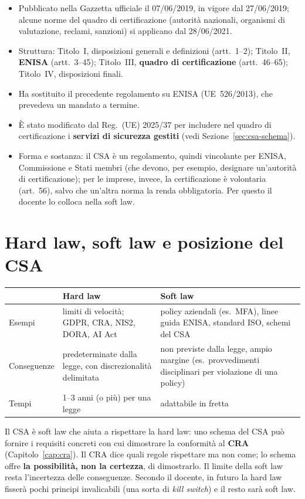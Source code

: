 \begin{integrazione}
\begin{itemize}
  \item Pubblicato nella Gazzetta ufficiale il 07/06/2019, in vigore dal 27/06/2019; alcune norme del
    quadro di certificazione (autorità nazionali, organismi di valutazione, reclami, sanzioni) si applicano
    dal 28/06/2021.
  \item Struttura: Titolo~I, disposizioni generali e definizioni (artt.~1--2); Titolo~II,
    \textbf{ENISA} (artt.~3--45); Titolo~III, \textbf{quadro di certificazione} (artt.~46--65);
    Titolo~IV, disposizioni finali.
  \item Ha sostituito il precedente regolamento su ENISA (UE~526/2013), che prevedeva un mandato a
    termine.
  \item È stato modificato dal Reg.~(UE) 2025/37 per includere nel quadro di certificazione i
    \textbf{servizi di sicurezza gestiti} (vedi Sezione~\ref{sec:csa-schema}).
  \item Forma e sostanza: il CSA è un regolamento, quindi vincolante per ENISA, Commissione e Stati
    membri (che devono, per esempio, designare un'autorità di certificazione); per le imprese, invece,
    la certificazione è volontaria (art.~56), salvo che un'altra norma la renda obbligatoria. Per questo
    il docente lo colloca nella soft law.
\end{itemize}
\end{integrazione}

\section{Hard law, soft law e posizione del CSA}
\label{sec:csa-softlaw}

\begin{center}
\small
\begin{tabularx}{\linewidth}{>{\raggedright\arraybackslash}p{3cm} X X}
\toprule
 & \textbf{Hard law} & \textbf{Soft law}\\
\midrule
Esempi & limiti di velocità; GDPR, CRA, NIS2, DORA, AI Act & policy aziendali (es.\ MFA), linee guida ENISA,
  standard ISO, schemi del CSA\\
Conseguenze & predeterminate dalla legge, con discrezionalità delimitata & non previste dalla legge,
  ampio margine (es.\ provvedimenti disciplinari per violazione di una policy)\\
Tempi & 1--3 anni (o più) per una legge & adattabile in fretta\\
\bottomrule
\end{tabularx}
\end{center}
Il CSA è soft law che aiuta a rispettare la hard law: uno schema del CSA può fornire i requisiti
concreti con cui dimostrare la conformità al \textbf{CRA} (Capitolo~\ref{cap:cra}). Il CRA dice quali
regole rispettare ma non come; lo schema offre \textbf{la possibilità, non la certezza}, di dimostrarlo.
Il limite della soft law resta l'incertezza delle conseguenze. Secondo il docente, in futuro la hard law
fisserà pochi principi invalicabili (una sorta di \emph{kill switch}) e il resto sarà soft law.

